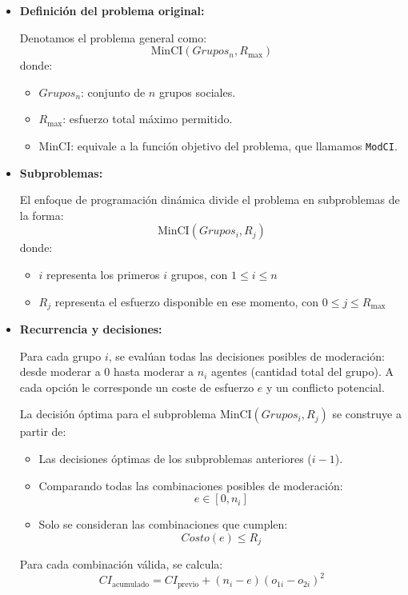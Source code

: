 \documentclass[11pt,letter]{article}
\begin{document}
\begin{itemize}
    \item \textbf{Definición del problema original:}

    Denotamos el problema general como:
    \[
        \text{MinCI}(Grupos_n, R_{\text{max}})
    \]
    donde:
    \begin{itemize}
        \item $Grupos_n$: conjunto de $n$ grupos sociales.
        \item $R_{\text{max}}$: esfuerzo total máximo permitido.
        \item $\text{MinCI}$: equivale a la función objetivo del problema, que llamamos \texttt{ModCI}.
    \end{itemize}

    \item \textbf{Subproblemas:}

    El enfoque de programación dinámica divide el problema en subproblemas de la forma:
    \[
        \text{MinCI}(Grupos_i, R_j)
    \]
    donde:
    \begin{itemize}
        \item $i$ representa los primeros $i$ grupos, con $1 \leq i \leq n$
        \item $R_j$ representa el esfuerzo disponible en ese momento, con $0 \leq j \leq R_{\text{max}}$
    \end{itemize}

    \item \textbf{Recurrencia y decisiones:}

    Para cada grupo $i$, se evalúan todas las decisiones posibles de moderación: desde moderar a $0$ hasta moderar a $n_i$ agentes (cantidad total del grupo). A cada opción le corresponde un coste de esfuerzo $e$ y un conflicto potencial.

    La decisión óptima para el subproblema $\text{MinCI}(Grupos_i, R_j)$ se construye a partir de:
    \begin{itemize}
        \item Las decisiones óptimas de los subproblemas anteriores ($i - 1$).
        \item Comparando todas las combinaciones posibles de moderación:
        \[
            e \in [0, n_i]
        \]
        \item Solo se consideran las combinaciones que cumplen:
        \[
            Costo(e) \leq R_j
        \]
    \end{itemize}

    Para cada combinación válida, se calcula:
    \[
        CI_{\text{acumulado}} = CI_{\text{previo}} + (n_i - e)(o_{1i} - o_{2i})^2
    \]


\end{itemize}
\end{document}
